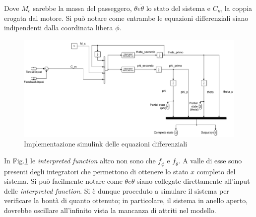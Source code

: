 Dove $M_c$ sarebbe la massa del passeggero, $\theta e \dot{\theta}$ lo stato del sistema e $C_m$  la coppia erogata dal motore. Si può notare come entrambe le equazioni differenziali siano indipendenti dalla coordinata libera $\phi$.
 \begin{figure}[H]
	\centering   	
	\includegraphics[width=1\textwidth]{Immagini/non_linear_system.png}
	\caption{Implementazione simulink delle equazioni differenziali}
	\label{fig:non_linear_system}
\end{figure}
In Fig.\ref{fig:non_linear_system} le \textit{interpreted function} altro non sono che  $f_{\ddot{\phi}}$ e $f_{\ddot{\theta}}$. A valle di esse sono presenti degli integratori che permettono di ottenere lo stato $x$ completo del sistema. Si può facilmente notare come $\dot{\theta} e \theta$ siano collegate direttamente all'input delle \textit{interpreted function}.
Si è dunque proceduto a  simulare il sistema per verificare la bontà di quanto ottenuto; in particolare, il sistema in anello aperto, dovrebbe oscillare all'infinito vista la mancanza di attriti nel modello.

